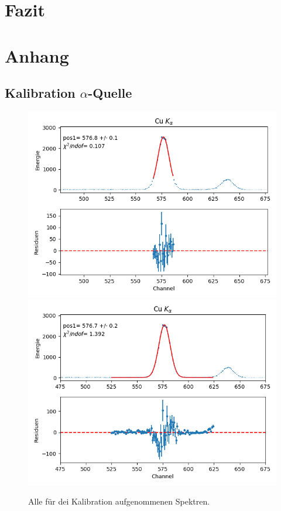 \documentclass[12pt,a4paper]{article}
\begin{document}
\section{Fazit}
\section{Anhang}
\subsection{Kalibration $\alpha$-Quelle}
\begin{figure}[H]
\centering
\includegraphics[scale=0.8]{Bilder/alpha/cu_alpha_1.png}
\includegraphics[scale=0.8]{Bilder/alpha/cu_alpha_2.png}
\caption{Alle für dei Kalibration aufgenommenen Spektren.}
\label{fig:kal_alles}
\end{figure}
\end{document}
